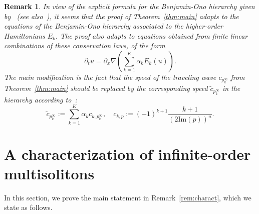 \documentclass[english, 12pt]{amsart}%
\renewcommand{\Im}{\mathrm{Im}}
\newtheorem{remark}[definition]{Remark}
\numberwithin{equation}{section}
\begin{document}
\begin{remark}
In view of the explicit formula for the Benjamin-Ono hierarchy given by~\cite{GerardHe26hierarchy} (see also~\cite{KillipLaurensVisan23-BO}), it seems that the proof of Theorem~\ref{thm:main} adapts to the equations of the Benjamin-Ono hierarchy associated to the higher-order Hamiltonians $E_k$. The proof also adapts to equations obtained from finite linear combinations of these conservation laws, of the form 
\[\partial_t u=\partial_x\nabla\left(\sum_{k=1}^K \alpha_k E_k(u)\right).
\]
The main modification is the fact that the speed of the traveling wave $c_{p_k^{\infty}}$ from Theorem~\ref{thm:main} should be replaced by the corresponding speed $\widetilde{c}_{p_k^{\infty}}$ in the hierarchy according to~\cite{GerardHe26hierarchy}:
\[
\widetilde{c}_{p_k^{\infty}}:=\sum_{k=1}^K \alpha_k c_{k,p_{k}^\infty},
\quad
c_{k,p}:=(-1)^{k+1}\frac{k+1}{(2\Im(p))^n}.
\]
\end{remark}




\appendix
\section{A characterization of infinite-order multisolitons}\label{sec:appendix}

In this section, we prove the main statement in Remark~\ref{rem:charact}, which we state as follows.
\end{document}
